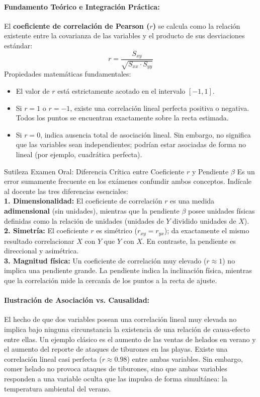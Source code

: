 \documentclass[11pt,letterpaper]{article}
\begin{document}
\paragraph{Fundamento Teórico e Integración Práctica:}
El \textbf{coeficiente de correlación de Pearson ($r$)} se calcula como la relación existente entre la covarianza de las variables y el producto de sus desviaciones estándar:
\begin{equation}
    r = \frac{S_{xy}}{\sqrt{S_{xx} \cdot S_{yy}}}
\end{equation}
Propiedades matemáticas fundamentales:
\begin{itemize}
    \item El valor de $r$ está estrictamente acotado en el intervalo $[-1, 1]$.
    \item Si $r = 1$ o $r = -1$, existe una correlación lineal perfecta positiva o negativa. Todos los puntos se encuentran exactamente sobre la recta estimada.
    \item Si $r = 0$, indica ausencia total de asociación lineal. Sin embargo, no significa que las variables sean independientes; podrían estar asociadas de forma no lineal (por ejemplo, cuadrática perfecta).
\end{itemize}

\begin{alertaBox}{Sutileza Examen Oral: Diferencia Crítica entre Coeficiente $r$ y Pendiente $\beta$}
Es un error sumamente frecuente en los exámenes confundir ambos conceptos. Indícale al docente las tres diferencias esenciales: \\
\textbf{1. Dimensionalidad:} El coeficiente de correlación $r$ es una medida \textbf{adimensional} (sin unidades), mientras que la pendiente $\beta$ posee unidades físicas definidas como la relación de unidades (unidades de $Y$ dividido unidades de $X$). \\
\textbf{2. Simetría:} El coeficiente $r$ es simétrico ($r_{xy} = r_{yx}$); da exactamente el mismo resultado correlacionar $X$ con $Y$ que $Y$ con $X$. En contraste, la pendiente es direccional y asimétrica. \\
\textbf{3. Magnitud física:} Un coeficiente de correlación muy elevado ($r \approx 1$) no implica una pendiente grande. La pendiente indica la inclinación física, mientras que la correlación mide la cercanía de los puntos a la recta de ajuste.
\end{alertaBox}

\paragraph{Ilustración de Asociación vs. Causalidad:}
El hecho de que dos variables posean una correlación lineal muy elevada no implica bajo ninguna circunstancia la existencia de una relación de causa-efecto entre ellas.
Un ejemplo clásico es el aumento de las ventas de helados en verano y el aumento del reporte de ataques de tiburones en las playas. Existe una correlación lineal casi perfecta ($r \approx 0.98$) entre ambas variables. Sin embargo, comer helado no provoca ataques de tiburones, sino que ambas variables responden a una variable oculta que las impulsa de forma simultánea: la temperatura ambiental del verano.
\end{document}
